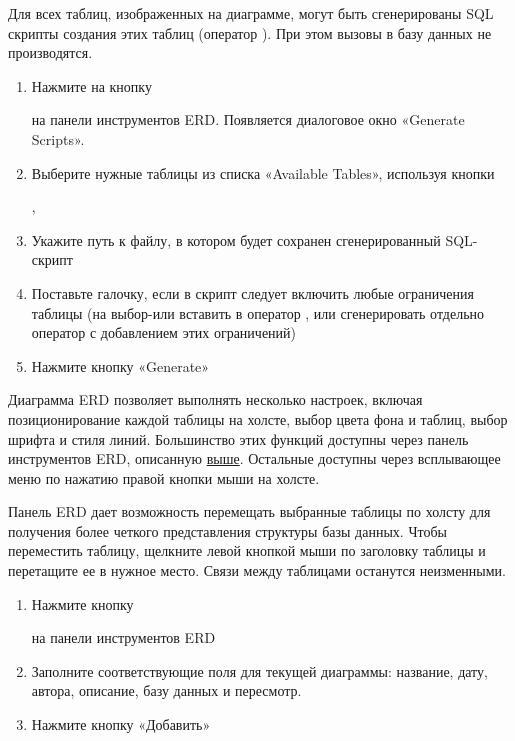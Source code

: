 
Для всех таблиц, изображенных на диаграмме, могут быть сгенерированы SQL скрипты создания этих таблиц (оператор ). При этом вызовы в базу данных не производятся. 
\begin{enumerate}
	\item Нажмите на кнопку 
	 на панели инструментов ERD. Появляется диалоговое окно «Generate Scripts». 
	\item Выберите нужные таблицы из списка «Available Tables», используя кнопки ,
	\item Укажите путь к файлу, в котором будет сохранен сгенерированный SQL-скрипт
	\item Поставьте галочку, если в скрипт следует включить любые ограничения таблицы (на выбор-или вставить в оператор , или сгенерировать отдельно оператор  с добавлением этих ограничений)
	\item Нажмите кнопку «Generate»
\end{enumerate}

Диаграмма ERD позволяет выполнять несколько настроек, включая позиционирование каждой таблицы на холсте, выбор цвета фона и таблиц, выбор шрифта и стиля линий. Большинство этих функций доступны через панель инструментов ERD, описанную \hyperref[sec:81]{выше}. Остальные доступны через всплывающее меню по нажатию правой кнопки мыши на холсте.


Панель ERD дает возможность перемещать выбранные таблицы по холсту для получения более четкого представления структуры базы данных. Чтобы переместить таблицу, щелкните левой кнопкой мыши по заголовку таблицы и перетащите ее в нужное место. Связи между таблицами останутся неизменными.

\begin{enumerate}
	\item Нажмите кнопку  на панели инструментов ERD
	\item Заполните соответствующие поля для текущей диаграммы: название, дату, автора, описание, базу данных и пересмотр.
	\item Нажмите кнопку «Добавить»
\end{enumerate}

